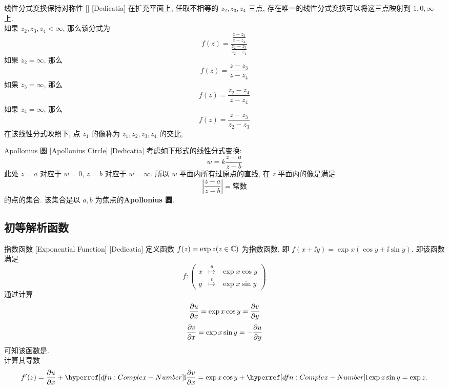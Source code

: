         \begin{ppt}
            {线性分式变换保持对称性}
            []
            [Dedicatia]
            在扩充平面上, 任取不相等的 \(z_2,z_3,z_4\) 三点, 存在唯一的线性分式变换可以将这三点映射到 \(1,0,\infty\) 上. \\
            如果 \(z_2,z_3,z_4<\infty\), 那么该分式为
            \[f(z)=\frac{\frac{z-z_3}{z-z_4}}{\frac{z_2-z_3}{z_2-z_4}}\]
            如果 \(z_2=\infty\), 那么
            \[f(z)=\frac{z-z_3}{z-z_4}\]
            如果 \(z_3=\infty\), 那么
            \[f(z)=\frac{z_2-z_4}{z-z_4}\]
            如果 \(z_4=\infty\), 那么
            \[f(z)=\frac{z-z_3}{z_2-z_3}\]
            在该线性分式映照下, 点 \(z_1\) 的像称为 \(z_1,z_2,z_3,z_4\) 的交比, 
        \end{ppt}

        \begin{xmp}
            {Apollonius 圆}
            [Apollonius Circle]
            [Dedicatia]
            考虑如下形式的线性分式变换: 
            \[w=k\frac{z-a}{z-b}\]
            此处 \(z=a\) 对应于 \(w=0\),  \(z=b\) 对应于 \(w=\infty\). 所以 \(w\) 平面内所有过原点的直线, 在 \(z\) 平面内的像是满足
            \[\left|\frac{z-a}{z-b}\right|=\text{常数}\]
            的点的集合. 该集合是以 \(a,b\) 为焦点的\textbf{Apollonius 圆}.
        \end{xmp}

    \subsection{初等解析函数}

        \begin{dfn}
            [Exponential]
            {指数函数}
            [Exponential Function]
            [Dedicatia]
            定义函数 \(f(z)=\exp z (z\in\operatorname{\mathbb{C}})\) 为指数函数. 即 \(f(x+\ii y)=\exp x(\cos y+\ii\sin y)\). 即该函数满足
            \[f:\begin{pmatrix}
                x&\overset{u}{\mapsto}&\exp x\cos y\\
                y&\overset{v}{\mapsto}&\exp x\sin y
            \end{pmatrix}\]
            通过计算
            \[\pdv{u}{x}=\exp x\cos y=\pdv{v}{y}\]
            \[\pdv{v}{x}=\exp x\sin y=-\pdv{u}{y}\]
            可知该函数是\Analytic{}. \\
            计算其导数
            \[f'(z)=\pdv{u}{x}+\ii\pdv{v}{x}=\exp x\cos y+\ii\exp x\sin y=\exp z.\]
        \end{dfn}


